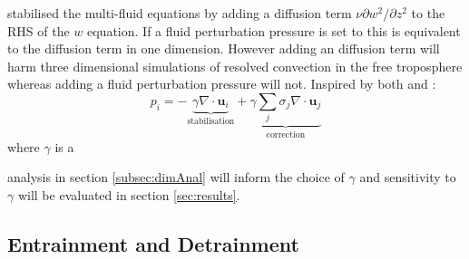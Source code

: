 \documentclass[draft]{agujournal2019}
\begin{document}
\subsubsection{}

 stabilised the multi-fluid equations by adding a diffusion
term $\nu\partial w^{2}/\partial z^{2}$ to the RHS of the $w$ equation.
If a fluid perturbation pressure is set to 
 this is equivalent to the diffusion term in one dimension. However adding an  diffusion term will harm three dimensional simulations of
resolved convection in the free troposphere whereas adding a fluid
perturbation pressure will not. Inspired by both  and
:
\begin{equation}
p_{i}=
-\underbrace{\gamma\nabla\cdot\mathbf{u}_{i}}_{\text{stabilisation}}
+
\underbrace{\gamma\sum_j \sigma_j\nabla\cdot\mathbf{u}_j}_{\text{correction}}
\label{eq:Pi_div}
\end{equation}
where $\gamma$ is a 

 analysis in section
\ref{subsec:dimAnal} will inform the choice of $\gamma$ and sensitivity
to $\gamma$ will be evaluated in section \ref{sec:results}.

\subsection{Entrainment and Detrainment \label{subsec:Sij}}
\end{document}
